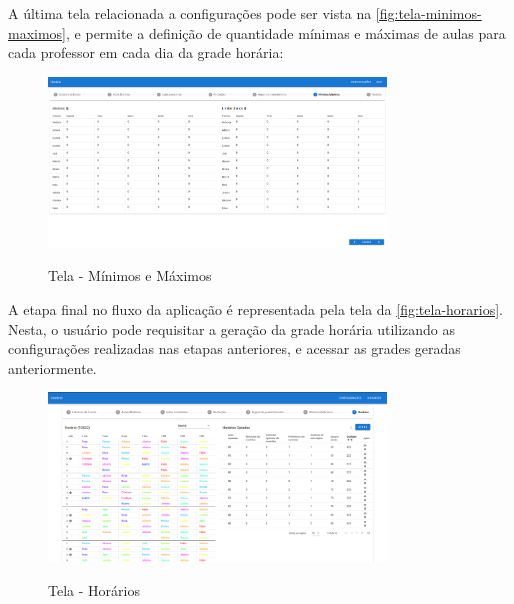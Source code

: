 A última tela relacionada a configurações pode ser vista na \autoref{fig:tela-minimos-maximos}, e permite a definição de quantidade mínimas e máximas de aulas para cada professor em cada dia da grade horária:

\begin{figure}[!htb]
	\centering
	\caption{Tela - Mínimos e Máximos}
	\includegraphics[width=0.8\textwidth]{./dados/figuras/tela_minimos_maximos}
	\label{fig:tela-minimos-maximos}
\end{figure}

A etapa final no fluxo da aplicação é representada pela tela da \autoref{fig:tela-horarios}. Nesta, o usuário pode requisitar a geração da grade horária utilizando as configurações realizadas nas etapas anteriores, e acessar as grades geradas anteriormente.

\begin{figure}[!htb]
	\centering
	\caption{Tela - Horários}
	\includegraphics[width=0.8\textwidth]{./dados/figuras/tela_horarios}
	\label{fig:tela-horarios}
\end{figure}
\newpage